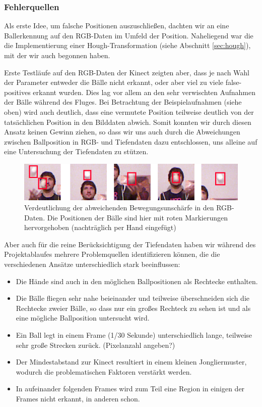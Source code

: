 \documentclass[12pt,a4paper,ngerman]{scrartcl}
\begin{document}
\subsubsection{Fehlerquellen}

Als erste Idee, um falsche Positionen auszuschließen, dachten wir an eine
Ballerkennung auf den RGB-Daten im Umfeld der Position. Naheliegend war die die
Implementierung einer Hough-Transformation (siehe Abschnitt \ref{sec:hough}), mit der wir auch begonnen haben.

Erste Testläufe auf den RGB-Daten der Kinect zeigten aber, dass je nach Wahl der
Parameter entweder die Bälle nicht erkannt, oder aber viel zu viele false-positives
erkannt wurden. Dies lag vor allem an den sehr verwischten Aufnahmen der Bälle
während des Fluges. Bei Betrachtung der Beispielaufnahmen (siehe oben) wird auch
deutlich, dass eine vermutete Position teilweise deutlich von der tatsächlichen
Position in den Bilddaten abwich. Somit konnten wir durch diesen Ansatz keinen Gewinn
ziehen, so dass wir uns auch durch die Abweichungen zwischen Ballposition in RGB- und
Tiefendaten dazu entschlossen, uns alleine auf eine Untersuchung der Tiefendaten zu
stützen.


\begin{figure}[H]
  \centering
      \includegraphics[scale=0.8]{img/rgb-blur.png}
  \caption{Verdeutlichung der abweichenden Bewegungsunschärfe in den RGB-Daten. Die Positionen der Bälle sind hier mit roten Markierungen hervorgehoben (nachträglich per Hand eingefügt)}
\end{figure}


Aber auch für die reine Berücksichtigung der Tiefendaten haben wir während des
Projektablaufes mehrere Problemquellen identifizieren können, die die verschiedenen
Ansätze unterschiedlich stark beeinflussen:

\begin{itemize}
 \item Die Hände sind auch in den möglichen Ballpositionen als Rechtecke enthalten.
 \item Die Bälle fliegen sehr nahe beieinander und teilweise überschneiden sich die Rechtecke zweier Bälle, so dass nur ein großes Rechteck zu sehen ist und als eine mögliche Ballposition untersucht wird.
 \item Ein Ball legt in einem Frame (1/30 Sekunde) unterschiedlich lange, teilweise sehr große Strecken zurück. (Pixelanzahl angeben?)
 \item Der Mindestabstand zur Kinect resultiert in einem kleinen Jongliermuster, wodurch die problematischen Faktoren verstärkt werden.
 \item In aufeinander folgenden Frames wird zum Teil eine Region in einigen der Frames nicht erkannt, in anderen schon.
\end{itemize}
\end{document}
